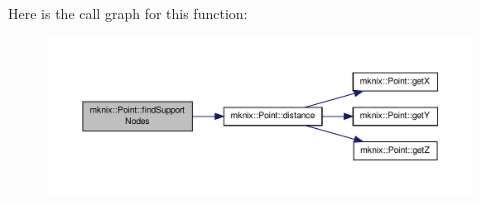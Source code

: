 Here is the call graph for this function\-:\nopagebreak
\begin{figure}[H]
\begin{center}
\leavevmode
\includegraphics[width=350pt]{d3/d19/classmknix_1_1_point_a88289f6649c16591f708e2a6f5eb749e_cgraph}
\end{center}
\end{figure}


